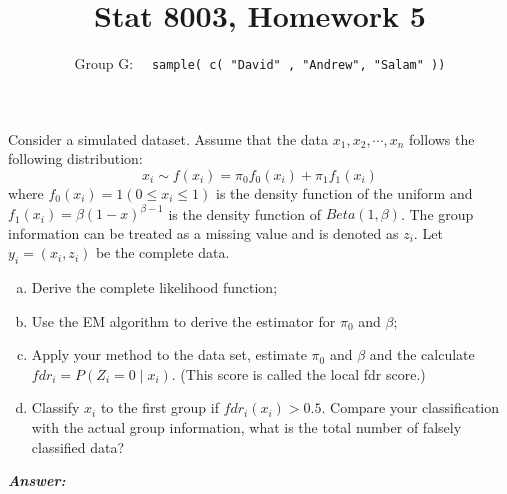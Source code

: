 \documentclass[12pt]{article}
\newenvironment{question}[2][Question]{\begin{trivlist}
\item[\hskip \labelsep {\bfseries #1}\hskip \labelsep {\bfseries #2.}]}{\end{trivlist}}
\begin{document}
 \renewcommand{\arraystretch}{1.3}

 
\title{Stat 8003, Homework 5}%
\author{Group G: \ \ \texttt{sample( c( "David" , "Andrew",  "Salam" ))}
\\ %
} %
 
\maketitle
 
 \begin{question}{5.1}  
 
 Consider a simulated dataset. Assume that the data $x_1, x_2, \cdots , x_n$ follows the following distribution:
 $$
 x_i \sim f(x_i) = \pi_0 f_0(x_i) + \pi_1 f_1(x_i)
 $$
 where $f_0(x_i) = 1(0 \leq x_i \leq 1)$ is the density function of the uniform and $f_1(x_i) = \beta (1 - x)^{\beta - 1} $ is the density function of $Beta(1, \beta)$. The group information can be treated as a
missing value and is denoted as $z_i$. Let $y_i = (x_i, z_i)$ be the complete data.	
 \begin{enumerate}[(a)]
\item Derive the complete likelihood function;
\item Use the EM algorithm to derive the estimator for $\pi_0$ and $\beta$;
\item Apply your method to the data set, estimate $\pi_0$ and $\beta$ and the calculate $fdr_i = P(Z_i = 0 \mid x_i)$. (This score is called the local fdr score.)
\item Classify $x_i$ to the first group if $fdr_i(x_i) > 0.5$. Compare your classification with the actual
group information, what is the total number of falsely classified data?
\end{enumerate}
\end{question} 


  \textbf{\color{TealBlue}\emph{Answer:} } 
    
\end{document}
